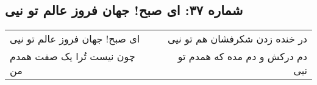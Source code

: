 \begin{center}
\section*{شماره ۳۷: ای صبح! جهان فروز عالم تو نیی}
\label{sec:037}
\begin{longtable}{l p{0.5cm} r}
ای صبح! جهان فروز عالم تو نیی
&&
در خنده زدن شکرفشان هم تو نیی
\\
چون نیست تُرا یک صفت همدم من
&&
دم درکش و دم مده که همدم تو نیی
\\
\end{longtable}
\end{center}
